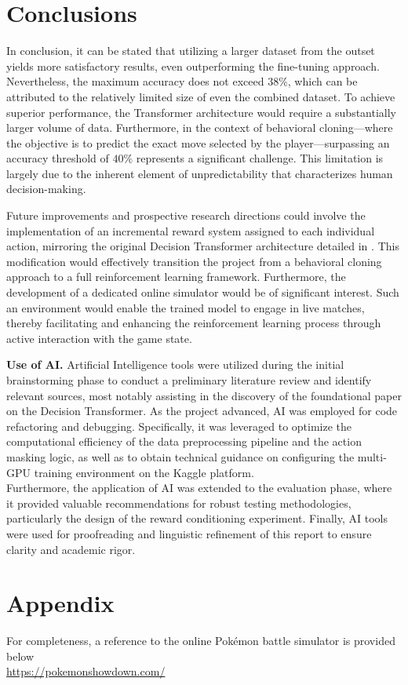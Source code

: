 \documentclass{article}
\begin{document}
\section{Conclusions}
In conclusion, it can be stated that utilizing a larger dataset from the outset yields more satisfactory results, even outperforming the fine-tuning approach. Nevertheless, the maximum accuracy does not exceed $38\%$, which can be attributed to the relatively limited size of even the combined dataset. To achieve superior performance, the Transformer architecture would require a substantially larger volume of data. Furthermore, in the context of behavioral cloning—where the objective is to predict the exact move selected by the player—surpassing an accuracy threshold of $40\%$ represents a significant challenge. This limitation is largely due to the inherent element of unpredictability that characterizes human decision-making. 

Future improvements and prospective research directions could involve the implementation of an incremental reward system assigned to each individual action, mirroring the original Decision Transformer architecture detailed in \cite{chen2021decision}. This modification would effectively transition the project from a behavioral cloning approach to a full reinforcement learning framework. Furthermore, the development of a dedicated online simulator would be of significant interest. Such an environment would enable the trained model to engage in live matches, thereby facilitating and enhancing the reinforcement learning process through active interaction with the game state.


%
\textbf{Use of AI.}
Artificial Intelligence tools were utilized during the initial brainstorming phase to conduct a preliminary literature review and identify relevant sources, most notably assisting in the discovery of the foundational paper on the Decision Transformer. As the project advanced, AI was employed for code refactoring and debugging. Specifically, it was leveraged to optimize the computational efficiency of the data preprocessing pipeline and the action masking logic, as well as to obtain technical guidance on configuring the multi-GPU training environment on the Kaggle platform.\\
Furthermore, the application of AI was extended to the evaluation phase, where it provided valuable recommendations for robust testing methodologies, particularly the design of the reward conditioning experiment. Finally, AI tools were used for proofreading and linguistic refinement of this report to ensure clarity and academic rigor. 

\nocite{*}





\section*{Appendix}
For completeness, a reference to the online Pokémon battle simulator is provided below \\ \url{https://pokemonshowdown.com/}
%
\end{document}
